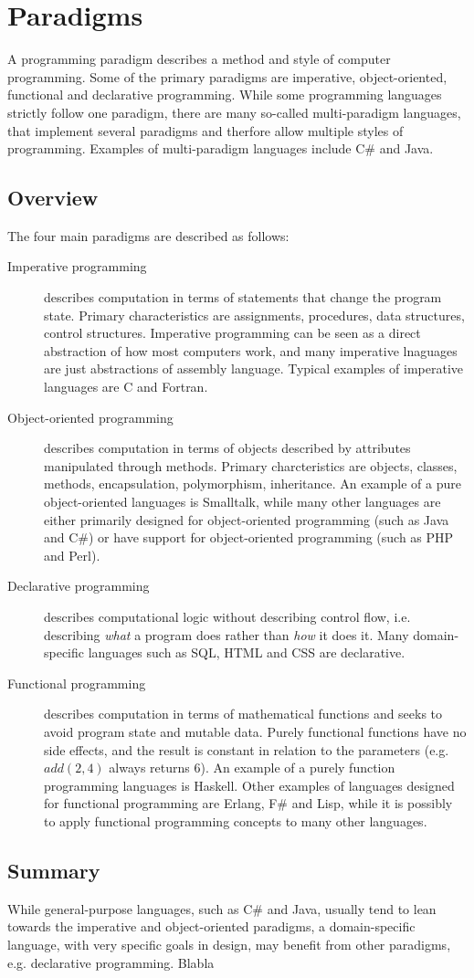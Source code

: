 \section{Paradigms}

A programming paradigm describes a method and style of computer programming.
Some of the primary paradigms are imperative, object-oriented, functional and declarative programming. While some programming languages strictly follow one paradigm, there are many so-called multi-paradigm languages, that implement several paradigms and therfore allow multiple styles of programming. Examples of multi-paradigm languages include C\# and Java.

\subsection{Overview}
The four main paradigms are described as follows:
\begin{description}
\item[Imperative programming] describes computation in terms of statements that change the program state. Primary characteristics are assignments, procedures, data structures, control structures. Imperative programming can be seen as a direct abstraction of how most computers work, and many imperative lnaguages are just abstractions of assembly language. Typical examples of imperative languages are C and Fortran.
\item[Object-oriented programming] describes computation in terms of objects described by attributes manipulated through methods. Primary charcteristics are objects, classes, methods, encapsulation, polymorphism, inheritance. An example of a pure object-oriented languages is Smalltalk, while many other languages are either primarily designed for object-oriented programming (such as Java and C\#) or have support for object-oriented programming (such as PHP and Perl).
\item[Declarative programming] describes computational logic without describing control flow, i.e. describing {\em what} a program does rather than {\em how} it does it. Many domain-specific languages such as SQL, HTML and CSS are declarative.  
\item[Functional programming] describes computation in terms of mathematical functions and seeks to avoid program state and mutable data. Purely functional functions have no side effects, and the result is constant in relation to the parameters (e.g. $add(2, 4)$ always returns $6$). An example of a purely function programming languages is Haskell. Other examples of languages designed for functional programming are Erlang, F\# and Lisp, while it is possibly to apply functional programming concepts to many other languages.
\end{description}

\subsection{Summary}

While general-purpose languages, such as C\# and Java, usually tend to lean towards the imperative and object-oriented paradigms, a domain-specific language, with very specific goals in design, may benefit from other paradigms, e.g. declarative programming.
Blabla
